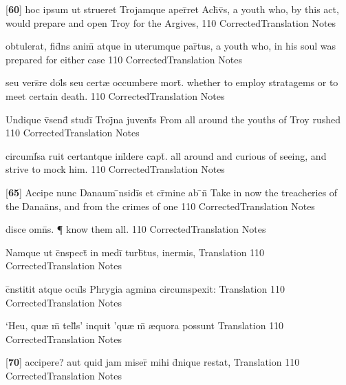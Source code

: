\latline
  {[\textbf{60}] hoc ipsum ut strueret Trojamque aper\={\macron {\i}}ret Ach\={\macron {\i}}v\={\macron {\i}}s,}
  { a youth who, by this act, would prepare and open Troy for the Argives, }
  {110}
  { CorrectedTranslation }
  { Notes }


\latline
  {obtulerat, fid\={}ns anim\={\macron {\i}} atque in uterumque par\={}tus,}
  { a youth who, in his soul was prepared for either case }
  {110}
  { CorrectedTranslation }
  { Notes }


\latline
  {seu vers\={}re dol\={}s seu cert{\ae} occumbere mort\={\macron {\i}}.}
  { whether to employ stratagems or to meet certain death. }
  {110}
  { CorrectedTranslation }
  { Notes }


\latline
  {Undique v\={\macron {\i}}send\={\macron {\i}} studi\={} Troj\={}na juvent\={}s}
  { From all around the youths of Troy rushed }
  {110}
  { CorrectedTranslation }
  { Notes }


\latline
  {circumf\={}sa ruit certantque inl\={}dere capt\={}.}
  { all around and curious of seeing, and strive to mock him. }
  {110}
  { CorrectedTranslation }
  { Notes }


\latline
  {[\textbf{65}] Accipe nunc Danaum \={\macron {\i}}nsidi\={}s et cr\={\macron {\i}}mine ab \={}n\={}}
  { Take in now the treacheries of the Dana\"ans, and from the crimes of one }
  {110}
  { CorrectedTranslation }
  { Notes }


\latline
  {disce omn\={\macron {\i}}s. \P}
  { know them all. }
  {110}
  { CorrectedTranslation }
  { Notes }


\latline
  {Namque ut c\={}nspect\={} in medi\={} turb\={}tus, inermis, }
  { Translation }
  {110}
  { CorrectedTranslation }
  { Notes }


\latline
  {c\={}nstitit atque ocul\={\macron {\i}}s Phrygia agmina circumspexit:}
  { Translation }
  {110}
  { CorrectedTranslation }
  { Notes }


\latline
  {`Heu, qu{\ae} m\={} tell\={}s' inquit 'qu{\ae} m\={} {\ae}quora possunt}
  { Translation }
  {110}
  { CorrectedTranslation }
  { Notes }


\latline
  {[\textbf{70}] accipere? aut quid jam miser\={} mihi d\={}nique restat,}
  { Translation }
  {110}
  { CorrectedTranslation }
  { Notes }


